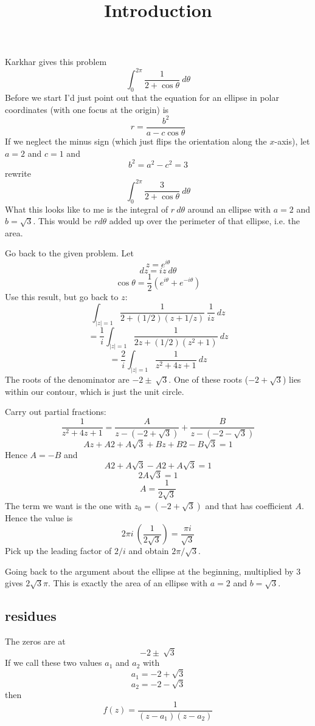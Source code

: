 \documentclass[11pt, oneside]{article}
\title{Introduction}
\date{}
\begin{document}
\maketitle
\Large

Karkhar gives this problem
\[ \int_0^{2\pi} \frac{1}{2 + \cos \theta} \ d \theta \]
Before we start I'd just point out that the equation for an ellipse in polar coordinates (with one focus at the origin) is
\[ r = \frac{b^2}{a - c \cos \theta} \]
If we neglect the minus sign (which just flips the orientation along the $x$-axis), let $a=2$ and $c=1$ and
\[ b^2 = a^2 - c^2 = 3 \]
rewrite
\[ \int_0^{2\pi} \frac{3}{2 + \cos \theta} \ d \theta \]
What this looks like to me is the integral of $r \ d \theta$ around an ellipse with $a = 2$ and $b = \sqrt{3}$.  This would be $r d \theta$ added up over the perimeter of that ellipse, i.e. the area.

Go back to the given problem.  Let
\[ z = e^{i\theta} \]
\[ dz = i z \ d \theta \]
\[ \cos \theta = \frac{1}{2}(e^{i\theta} + e^{-i \theta} ) \]
Use this result, but go back to $z$:
\[ \int_{|z|=1} \frac{1}{2 + (1/2)(z + 1/z)} \ \frac{1}{iz} \ dz \]
\[ = \frac{1}{i}  \int_{|z|=1} \frac{1}{2z + (1/2)(z^2 + 1)} \ dz \]
\[ = \frac{2}{i}  \int_{|z|=1} \frac{1}{z^2 + 4z + 1} \ dz \]
The roots of the denominator are $-2 \pm \ \sqrt{3}$.  One of these roots ($-2 + \sqrt{3}$) lies within our contour, which is just the unit circle.

Carry out partial fractions:
\[ \frac{1}{z^2 + 4z + 1} = \frac{A}{z - (-2 + \sqrt{3})} + \frac{B}{z - (-2 - \sqrt{3})} \]
\[ Az + A2 + A \sqrt{3} + Bz + B2 - B \sqrt{3} = 1 \]
Hence $A = -B$ and
\[ A2 + A \sqrt{3} -A2 + A \sqrt{3} = 1 \]
\[ 2A \sqrt{3} = 1 \]
\[ A = \frac{1}{2 \sqrt{3}} \]
The term we want is the one with $z_0 = (-2 + \sqrt{3})$ and that has coefficient $A$.  Hence the value is
\[ 2 \pi i \ (\frac{1}{2 \sqrt{3}}) = \frac{\pi i}{\sqrt{3}} \]
Pick up the leading factor of $2/i$ and obtain $2 \pi / \sqrt{3}$.

Going back to the argument about the ellipse at the beginning, multiplied by $3$ gives $2 \sqrt{3} \pi$.  This is exactly the area of an ellipse with $a = 2$ and $b = \sqrt{3}$.

\subsection*{residues}
The zeros are at 
\[ -2 \pm \ \sqrt{3} \]
If we call these two values $a_1$ and $a_2$ with
\[ a_1 = -2 + \sqrt{3} \]
\[ a_2 = -2 - \sqrt{3} \]
then
\[ f(z) = \frac{1}{(z - a_1)(z - a_2)} \]
\end{document}
